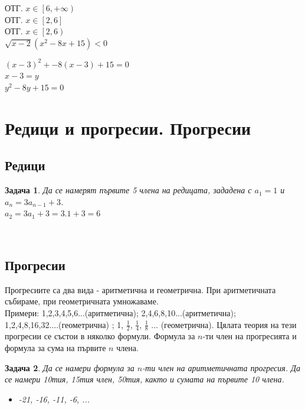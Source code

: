 \documentclass{article}
\newtheorem{problem}{Задача}
\begin{document}
ОТГ. $ x \in \left[ 6, + \infty \right) $ \\
ОТГ. $ x \in \left[ 2, 6 \right] $ \\
ОТГ. $ x \in \left[ 2 , 6 \right) $ \\ 


$ \sqrt{x-2}(x^2 - 8x + 15) < 0 $


$(x-3)^2 + -8(x-3) + 15 = 0 $ \\
$x-3 = y $ \\
$y^2 - 8y + 15 = 0 $



\section{Редици и прогресии. Прогресии}

\subsection{Редици}

\begin{problem} Да се намерят първите 5 члена на редицата, зададена с
	$a_1 = 1 $ и	$a_n = 3a_{n-1} + 3 $. \\
	
	
	  $a_2 = 3a_1 + 3 = 3.1 + 3 = 6 $
	  
	  
\end{problem}
$ $


\subsection{Прогресии}
Прогресиите са два вида - аритметична и геометрична. При аритметичната събираме, при геометричната умножаваме. \\
Примери: 1,2,3,4,5,6...(аритметична); 2,4,6,8,10...(аритметична); \\ 1,2,4,8,16,32....(геометрична) ; 1, $\frac{1}{2}$, $\frac{1}{4}$, $\frac{1}{8}$ ... (геометрична).
Цялата теория на тези прогресии се състои в няколко формули. Формула за $n$-ти член на прогресията и формула за сума на първите $n$ члена.

\begin{problem}
	Да се намери формула за $n$-ти член на аритметичната прогресия. Да се намери 10тия, 15тия член, 50тия, както и сумата на първите 10 члена.
	\begin{itemize}
		\item -21, -16, -11, -6, ...
		
	\end{itemize}
\end{problem}
\end{document}
